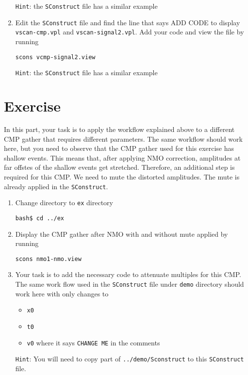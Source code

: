 \begin{enumerate}
\texttt{Hint}: the \texttt{SConstruct} file has a similar example

\item Edit the \texttt{SConstruct} file and find the line that says ADD CODE to display \texttt{vscan-cmp.vpl} and \texttt{vscan-signal2.vpl}.  Add your code and view the file by running
\begin{verbatim}
scons vcmp-signal2.view
\end{verbatim}

\texttt{Hint}: the \texttt{SConstruct} file has a similar example

\end{enumerate}

\section{Exercise}

In this part, your task is to apply the workflow explained above to a different CMP gather that requires different parameters. The same workflow should work here, but you need to observe that the CMP gather used for this exercise has shallow events. This means that, after applying NMO correction, amplitudes at far offstes of the shallow events get stretched. Therefore, an additional step is required for this CMP. We need to mute the distorted amplitudes. The mute is already applied in the \texttt{SConstruct}. 
\begin{enumerate}

\item Change directory to \texttt{ex} directory
\begin{verbatim}
bash$ cd ../ex
\end{verbatim}

\item Display the CMP gather after NMO with and without mute applied by running 
\begin{verbatim}
scons nmo1-nmo.view
\end{verbatim}

\item Your task is to add the necessary code to attenuate multiples for this CMP.
The same work flow used in the \texttt{SConstruct} file under \texttt{demo} directory should work here with only changes to 
\begin{itemize}
\item \texttt{x0}
\item \texttt{t0}
\item \texttt{v0}
\newline where it says \texttt{CHANGE ME} in the comments
\end{itemize}

\texttt{Hint}: You will need to copy part of \texttt{../demo/Sconstruct} to this \texttt{SConstruct} file.

\end{enumerate}

